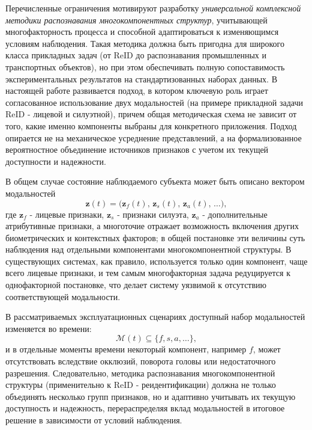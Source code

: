 Перечисленные ограничения мотивируют разработку \emph{универсальной
комплексной методики распознавания многокомпонентных структур},
учитывающей многофакторность процесса и способной адаптироваться
к изменяющимся условиям наблюдения. Такая методика должна быть пригодна
для широкого класса прикладных задач (от ReID до распознавания
промышленных и транспортных объектов), но при этом обеспечивать
полную сопоставимость экспериментальных результатов на стандартизованных
наборах данных. В настоящей работе развивается подход, в котором ключевую
роль играет согласованное использование двух модальностей (на примере
прикладной задачи ReID - лицевой и силуэтной), причем общая
методическая схема не зависит от того, какие именно компоненты выбраны
для конкретного приложения. Подход опирается не на механическое
усреднение представлений, а на формализованное вероятностное объединение
источников признаков с учетом их текущей доступности и надежности.

В общем случае состояние наблюдаемого субъекта может быть описано вектором
модальностей
\[
    \mathbf{z}(t)=\bigl(\mathbf{z}_{f}(t),\,\mathbf{z}_{s}(t),\,\mathbf{z}_{a}(t),\,\ldots\bigr),
\]
где $\mathbf{z}_{f}$ - лицевые признаки, $\mathbf{z}_{s}$ - признаки
силуэта, $\mathbf{z}_{a}$ - дополнительные атрибутивные признаки, а
многоточие отражает возможность включения других биометрических и
контекстных факторов; в общей постановке эти величины суть наблюдения над
отдельными компонентами многокомпонентной структуры. В существующих
системах, как правило, используется только один компонент, чаще всего
лицевые признаки, и тем самым многофакторная задача редуцируется
к однофакторной постановке, что делает систему уязвимой к отсутствию
соответствующей модальности.

В рассматриваемых эксплуатационных сценариях доступный набор модальностей
изменяется во времени:
\[
    \mathcal{M}(t)\subseteq\{f,s,a,\ldots\},
\]
и в отдельные моменты времени некоторый компонент, например $f$, может
отсутствовать вследствие окклюзий, поворота головы или недостаточного
разрешения. Следовательно, методика распознавания многокомпонентной
структуры (применительно к ReID - реидентификации) должна не только
объединять несколько групп признаков, но и адаптивно учитывать их текущую
доступность и надежность, перераспределяя вклад модальностей в итоговое
решение в зависимости от условий наблюдения.

